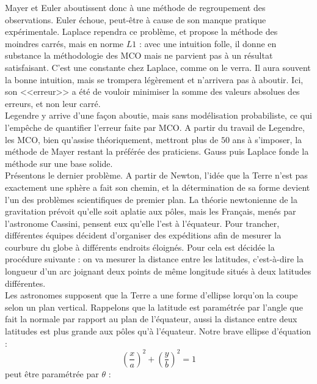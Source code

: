 \documentclass{article}
\begin{document}
Mayer et Euler aboutissent donc à une méthode de regroupement des observations. Euler échoue, peut-être à cause de son manque pratique expérimentale. Laplace rependra ce problème, et propose la méthode des moindres carrés, mais en norme $L1$ : avec une intuition folle, il donne en substance la méthodologie des MCO mais ne parvient pas à un résultat satisfaisant. C'est une constante chez Laplace, comme on le verra. Il aura souvent la bonne intuition, mais se trompera légèrement et n'arrivera pas à aboutir. Ici, son <<erreur>> a été de vouloir minimiser la somme des valeurs absolues des erreurs, et non leur carré.\\

Legendre y arrive d'une façon aboutie, mais sans modélisation probabiliste, ce qui l'empêche de quantifier l'erreur faite par MCO.  A partir du travail de Legendre, les MCO, bien qu'assise théoriquement, mettront plus de $50$ ans à s'imposer, la méthode de Mayer restant la préférée des praticiens. Gauss puis Laplace fonde la méthode sur une base solide.\\

Présentons le dernier problème. A partir de Newton, l'idée que la Terre n'est pas exactement une sphère a fait son chemin, et la détermination de sa forme devient l'un des problèmes scientifiques de premier plan. La théorie newtonienne de la gravitation prévoit qu'elle soit aplatie aux pôles, mais les Français, menés par l'astronome Cassini, pensent eux qu'elle l'est à l'équateur. Pour trancher, différentes équipes décident d'organiser des expéditions afin de mesurer la courbure du globe à différents endroits éloignés. Pour cela est décidée la procédure suivante : on va mesurer la distance entre les latitudes, c'est-à-dire la longueur d'un arc joignant deux points de même longitude situés à deux latitudes différentes. \\

Les astronomes supposent que la Terre a une forme d'ellipse lorqu'on la coupe selon un plan vertical. Rappelons que la latitude est paramétrée par l'angle que fait la normale par rapport au plan de l'équateur, aussi la distance entre deux latitudes est plus grande aux pôles qu'à l'équateur. Notre brave ellipse d'équation :
\[\left(\frac{x}{a}\right)^2+\left(\frac{y}{b}\right)^2=1\]
peut être paramétrée par $\theta$ :
\end{document}
